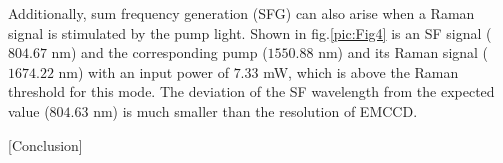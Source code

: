 \documentclass[a4paper,8pt,hyperref, twocolumn]{article}
\begin{document}
Additionally, sum frequency generation (SFG) can also arise when a Raman signal is stimulated by the pump light. 
Shown in fig.\ref{pic:Fig4} is an SF signal ($804.67$ nm) and the corresponding pump ($1550.88$ nm) and its Raman signal ($1674.22$ nm) with an input power of $7.33$ mW, which is above the Raman threshold for this mode. 
The deviation of the SF wavelength from the expected value ($804.63$ nm) is much smaller than the resolution of EMCCD.

[Conclusion]





\end{document}
